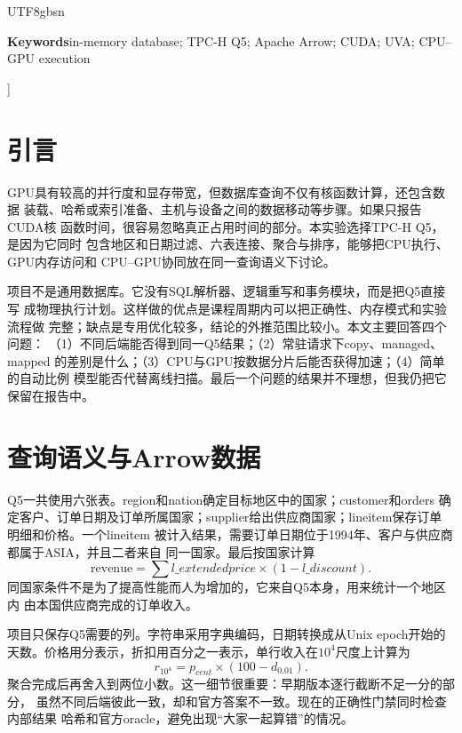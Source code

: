 \documentclass[10.5pt,compsoc]{CjC}
\begin{document}
\begin{CJK*}{UTF8}{gbsn}
\begin{center}
\begin{minipage}{0.94\textwidth}
\textbf{Keywords}\quad in-memory database; TPC-H Q5; Apache Arrow; CUDA; UVA; CPU--GPU execution
\end{minipage}
\vspace{5mm}
\end{center}
]


\section{引言}

GPU具有较高的并行度和显存带宽，但数据库查询不仅有核函数计算，还包含数据
装载、哈希或索引准备、主机与设备之间的数据移动等步骤。如果只报告CUDA核
函数时间，很容易忽略真正占用时间的部分。本实验选择TPC-H Q5，是因为它同时
包含地区和日期过滤、六表连接、聚合与排序，能够把CPU执行、GPU内存访问和
CPU--GPU协同放在同一查询语义下讨论。

项目不是通用数据库。它没有SQL解析器、逻辑重写和事务模块，而是把Q5直接写
成物理执行计划。这样做的优点是课程周期内可以把正确性、内存模式和实验流程做
完整；缺点是专用优化较多，结论的外推范围比较小。本文主要回答四个问题：
（1）不同后端能否得到同一Q5结果；（2）常驻请求下copy、managed、mapped
的差别是什么；（3）CPU与GPU按数据分片后能否获得加速；（4）简单的自动比例
模型能否代替离线扫描。最后一个问题的结果并不理想，但我仍把它保留在报告中。

\section{查询语义与Arrow数据}

Q5一共使用六张表。region和nation确定目标地区中的国家；customer和orders
确定客户、订单日期及订单所属国家；supplier给出供应商国家；lineitem保存订单
明细和价格。一个lineitem
被计入结果，需要订单日期位于1994年、客户与供应商都属于ASIA，并且二者来自
同一国家。最后按国家计算
\begin{equation}
  \mathrm{revenue}=\sum l\_extendedprice\times(1-l\_discount).
\end{equation}
同国家条件不是为了提高性能而人为增加的，它来自Q5本身，用来统计一个地区内
由本国供应商完成的订单收入。

项目只保存Q5需要的列。字符串采用字典编码，日期转换成从Unix epoch开始的
天数。价格用分表示，折扣用百分之一表示，单行收入在$10^4$尺度上计算为
\begin{equation}
  r_{10^4}=p_{cent}\times(100-d_{0.01}).
\end{equation}
聚合完成后再舍入到两位小数。这一细节很重要：早期版本逐行截断不足一分的部分，
虽然不同后端彼此一致，却和官方答案不一致。现在的正确性门禁同时检查内部结果
哈希和官方oracle，避免出现“大家一起算错”的情况。


\end{CJK*}
\end{document}
